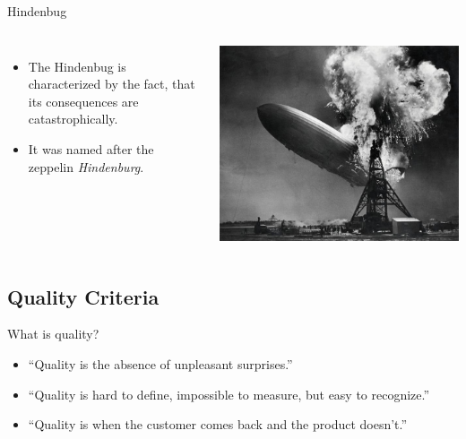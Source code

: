 \begin{frame}{Hindenbug}
\begin{columns}
\begin{itemize}
	\item The Hindenbug is characterized by the fact, that its consequences are catastrophically.
	\item It was named after the zeppelin \emph{Hindenburg}.
\end{itemize}
\includegraphics[width=\textwidth]{content/images/software-quality/hindenburg.jpg}
\end{columns}

\end{frame}




\subsection{Quality Criteria}

\begin{frame}{What is quality?}
\begin{itemize}
	\item \enquote{Quality is the absence of unpleasant surprises.}
	
	\item \enquote{Quality is hard to define, impossible to measure, but easy to recognize.}
	
	\item \enquote{Quality is when the customer comes back and the product doesn't.}
	
\end{itemize}

\end{frame}


